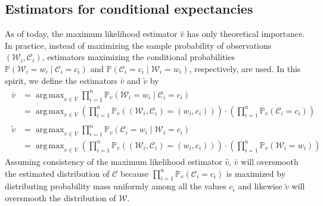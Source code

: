 \documentclass{amsart}
\theoremstyle{plain}
\theoremstyle{definition}
\renewcommand{\P}{\mathbb{P}}
\DeclareMathOperator*{\argmax}{arg\,max}
\begin{document}
\subsection{Estimators for conditional expectancies}
\label{subsec:skip-gram-cbow}
As of today, the maximum likelihood estimator $\hat v$ has only theoretical importance.
In practice, instead of maximizing the sample probability of observations $(\mathcal{W}_i, \mathcal{C}_i)$, estimators maximizing the conditional probabilities $\P(\mathcal{W}_i = w_i \mid \mathcal{C}_i = c_i)$ and  $\P(\mathcal{C}_i = c_i \mid \mathcal{W}_i = w_i)$, respectively, are used.
In this spirit, we define the estimators $\bar v$ and $\tilde v$ by
\begin{align}
  \label{eq:def-bar-v}
  \begin{split}
    \bar v & = \argmax_{v \in V} \prod_{i = 1}^n \P_v(\mathcal{W}_i = w_i \mid \mathcal{C}_i = c_i) \\
           & = \argmax_{v \in V} \left( \prod_{i = 1}^n \P_v((\mathcal{W}_i, \mathcal{C}_i) = (w_i, c_i) ) \right) \cdot \left( \prod_{i = 1}^n \P_v(\mathcal{C}_i = c_i) \right)
  \end{split} \\
  \begin{split}
    \tilde v & = \argmax_{v \in V} \prod_{i = 1}^n \P_v(\mathcal{C}_i = w_i \mid \mathcal{W}_i = c_i) \\
             & = \argmax_{v \in V} \left( \prod_{i = 1}^n \P_v((\mathcal{W}_i, \mathcal{C}_i) = (w_i, c_i) ) \right) \cdot \left( \prod_{i = 1}^n \P_v(\mathcal{W}_i = w_i) \right)
  \end{split}
\end{align}
Assuming consistency of the maximum likelihood estimator $\hat v$, $\bar v$ will oversmooth the estimated distribution of $\mathcal{C}$ because $\prod_{i = 1}^n \P_v(\mathcal{C}_i = c_i)$ is maximized by distributing probability mass uniformly among all the values $c_i$ and likewise $\tilde v$ will oversmooth the distribution of $\mathcal{W}$.
\end{document}

